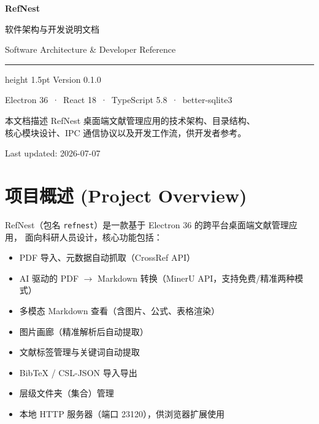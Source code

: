 \documentclass[12pt, a4paper]{article}
\begin{document}
\begin{titlepage}
  \centering
  \vspace*{3cm}
  {\Huge\bfseries\color{tsinghuapurple} RefNest}\par
  \vspace{0.6em}
  {\Large\color{sectionblue} 软件架构与开发说明文档}\par
  \vspace{0.4em}
  {\large Software Architecture \& Developer Reference}\par
  \vspace{2em}
  \hrule height 1.5pt \relax
  \vspace{2em}
  {\large Version 0.1.0}\par
  \vspace{0.5em}
  {\normalsize Electron 36 \,·\, React 18 \,·\, TypeScript 5.8 \,·\, better-sqlite3}\par
  \vspace{4cm}
  {\small 本文档描述 RefNest 桌面端文献管理应用的技术架构、目录结构、\\
  核心模块设计、IPC 通信协议以及开发工作流，供开发者参考。}\par
  \vfill
  {\small\color{gray} Last updated: 2026-07-07}
\end{titlepage}

\tableofcontents
\newpage

\section{项目概述 (Project Overview)}

RefNest（包名 \texttt{refnest}）是一款基于 Electron 36 的跨平台桌面端文献管理应用，
面向科研人员设计，核心功能包括：

\begin{itemize}[leftmargin=2em, itemsep=2pt]
  \item PDF 导入、元数据自动抓取（CrossRef API）
  \item AI 驱动的 PDF $\to$ Markdown 转换（MinerU API，支持免费/精准两种模式）
  \item 多模态 Markdown 查看（含图片、公式、表格渲染）
  \item 图片画廊（精准解析后自动提取）
  \item 文献标签管理与关键词自动提取
  \item BibTeX / CSL-JSON 导入导出
  \item 层级文件夹（集合）管理
  \item 本地 HTTP 服务器（端口 23120），供浏览器扩展使用
\end{itemize}
\end{document}
